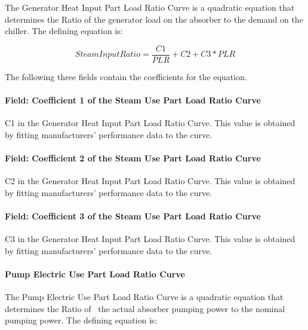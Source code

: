 The Generator Heat Input Part Load Ratio Curve is a quadratic equation that determines the Ratio of the generator load on the absorber to the demand on the chiller. The defining equation is:

\begin{equation}
    SteamInputRatio = \frac{{C1}}{{PLR}} + C2 + C3 * PLR
\end{equation}

The following three fields contain the coefficients for the equation.

\paragraph{Field: Coefficient 1 of the Steam Use Part Load Ratio Curve}\label{field-coefficient-1-of-the-steam-use-part-load-ratio-curve}

C1 in the Generator Heat Input Part Load Ratio Curve. This value is obtained by fitting manufacturers' performance data to the curve.

\paragraph{Field: Coefficient 2 of the Steam Use Part Load Ratio Curve}\label{field-coefficient-2-of-the-steam-use-part-load-ratio-curve}

C2 in the Generator Heat Input Part Load Ratio Curve. This value is obtained by fitting manufacturers' performance data to the curve.

\paragraph{Field: Coefficient 3 of the Steam Use Part Load Ratio Curve}\label{field-coefficient-3-of-the-steam-use-part-load-ratio-curve}

C3 in the Generator Heat Input Part Load Ratio Curve. This value is obtained by fitting manufacturers' performance data to the curve.

\paragraph{Pump Electric Use Part Load Ratio Curve}\label{pump-electric-use-part-load-ratio-curve}

The Pump Electric Use Part Load Ratio Curve is a quadratic equation that determines the Ratio of~ the actual absorber pumping power to the nominal pumping power. The defining equation is:

